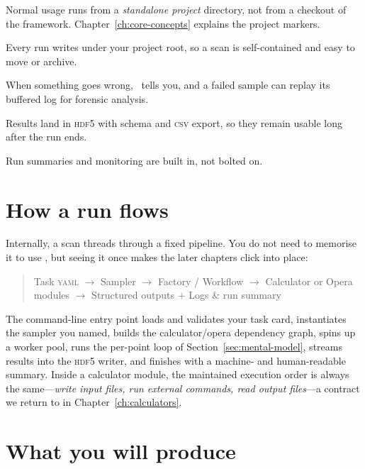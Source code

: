 \begin{description}[style=nextline, leftmargin=1.2em]
  \item[No repo-root requirement] Normal usage runs from a \emph{standalone project}
        directory, not from a checkout of the framework. Chapter~\ref{ch:core-concepts}
        explains the project markers.
  \item[Project-local outputs by default] Every run writes under your project root, so a
        scan is self-contained and easy to move or archive.
  \item[Explicit logging over silent failure] When something goes wrong, \Jarvis\ tells you,
        and a failed sample can replay its buffered log for forensic analysis.
  \item[Structured, post-processable outputs] Results land in \textsc{hdf5} with schema and
        \textsc{csv} export, so they remain usable long after the run ends.
  \item[Additive diagnostics] Run summaries and monitoring are built in, not bolted on.
\end{description}

\section{How a run flows}
\label{sec:run-flow}

Internally, a scan threads through a fixed pipeline. You do not need to memorise it to use
\Jarvis, but seeing it once makes the later chapters click into place:

\begin{quote}
\sffamily\footnotesize
Task \textsc{yaml} $\rightarrow$ Sampler $\rightarrow$ Factory / Workflow $\rightarrow$
Calculator or Opera modules $\rightarrow$ Structured outputs $+$ Logs \& run summary
\end{quote}

The command-line entry point loads and validates your task card, instantiates the sampler
you named, builds the calculator/opera dependency graph, spins up a worker pool, runs the
per-point loop of Section~\ref{sec:mental-model}, streams results into the \textsc{hdf5}
writer, and finishes with a machine- and human-readable summary. Inside a calculator module,
the maintained execution order is always the same---\emph{write input files, run external
commands, read output files}---a contract we return to in Chapter~\ref{ch:calculators}.

\section{What you will produce}
\label{sec:what-you-produce}

